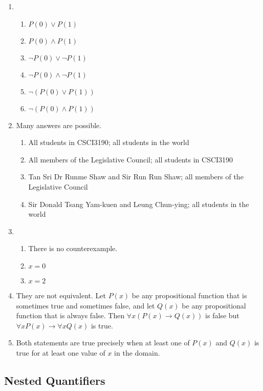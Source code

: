 \documentclass{../../cls/sig-alternate-05-2015}
\begin{document}
\begin{enumerate}
\item 
\begin{enumerate}
	\item $P(0) \vee P(1)$
	\item $P(0) \wedge P(1)$
	\item $\neg P(0) \vee \neg P(1)$
	\item $\neg P(0) \wedge \neg P(1)$
	\item $\neg(P(0) \vee P(1))$
	\item $\neg(P(0) \wedge P(1))$
\end{enumerate}

\item Many answers are possible.
\begin{enumerate}
	\item All students in CSCI3190; all students in	the world
	\item All members of the Legislative Council; all students in CSCI3190
	\item Tan Sri Dr Runme Shaw and Sir Run Run Shaw; all members of the Legislative Council
	\item Sir Donald Tsang Yam-kuen and Leung Chun-ying; all students in the world
\end{enumerate}

\item 
\begin{enumerate}
	\item There is no counterexample.
	\item $x = 0$
	\item $x = 2$
\end{enumerate}

\item They are not equivalent.
Let $P(x)$ be any propositional function that is sometimes
true and sometimes false, and let $Q(x)$ be any propositional
function that is always false. Then $\forall x (P(x) \rightarrow Q(x))$ is false
but $\forall x P(x) \rightarrow \forall x Q(x)$ is true.

\item Both statements are
true precisely when at least one of $P(x)$ and $Q(x)$ is true for
at least one value of $x$ in the domain.

\end{enumerate}

\subsection{Nested Quantifiers}
\end{document}
